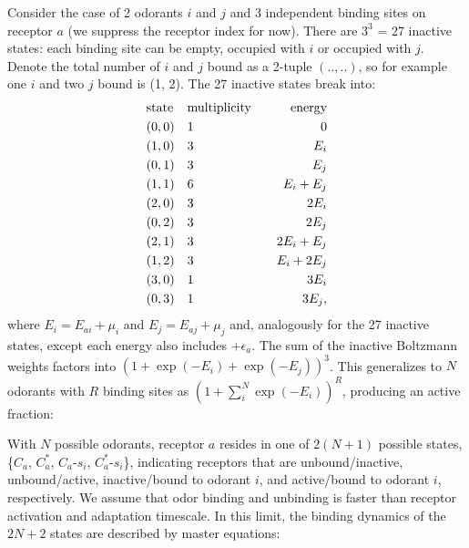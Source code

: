 \documentclass[9pt,twoside,lineno]{pnas-new}
\begin{document}
Consider the case of 2 odorants $i$ and $j$ and 3 independent binding sites on receptor $a$ (we suppress the receptor index for now). There are $3^3$ = 27 inactive states: each binding site can be empty, occupied with $i$ or occupied with $j$. Denote the total number of $i$ and $j$ bound as a 2-tuple $(..,..)$, so for example one $i$ and two $j$ bound is (1, 2). The 27 inactive states break into:
\begin{align}
    &\textup{state} && \textup{multiplicity} &&& \textup{energy} \nonumber \\
    &(0, 0)         && 1                     &&&  0 \nonumber \\
    &(1, 0)         && 3                     &&&  E_i \nonumber \\
    &(0, 1)         && 3                     &&&  E_j \nonumber \\
    &(1, 1)         && 6                     &&&  E_i + E_j \nonumber \\
    &(2, 0)         && 3                     &&&  2E_i \nonumber \\
    &(0, 2)         && 3                     &&&  2E_j \nonumber \\
    &(2, 1)         && 3                     &&&  2E_i + E_j \nonumber \\
    &(1, 2)         && 3                     &&&  E_i + 2E_j \nonumber \\
    &(3, 0)         && 1                     &&&  3E_i \nonumber \\
    &(0, 3)         && 1                     &&&  3E_j \nonumber,
\end{align}
where $E_i = E_{ai} + \mu_i$ and $E_j = E_{aj} + \mu_j$ and, analogously for the 27 inactive states, except each energy also includes $+\epsilon_a$. The sum of the inactive Boltzmann weights factors into $(1 + \exp(-E_i) + \exp(-E_j))^3$. This generalizes to $N$ odorants with $R$ binding sites as $(1 + \sum_i^N \exp(-E_i))^R$, producing an active fraction:

\fi












\iffalse

With $N$ possible odorants, receptor $a$ resides in one of $2(N+1)$ possible states, \{$C_a$, $C^*_a$, $C_a$-$s_i$, $C^*_a$-$s_i$\}, indicating receptors that are unbound/inactive, unbound/active, inactive/bound to odorant $i$, and active/bound to odorant $i$, respectively. We assume that odor binding and unbinding is faster than receptor activation and adaptation timescale. In this limit, the binding dynamics of the $2N + 2$ states are described by master equations:
\end{document}
